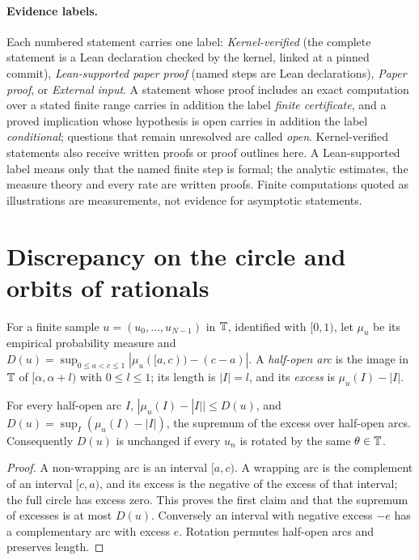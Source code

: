 \documentclass[11pt]{article}
\begin{document}
\paragraph{Evidence labels.} Each numbered statement carries one label:
\emph{Kernel-verified} (the complete statement is a Lean declaration checked by the kernel, linked
at a pinned commit), \emph{Lean-supported paper proof} (named steps are Lean declarations),
\emph{Paper proof}, or \emph{External input}. A statement whose proof includes an exact computation
over a stated finite range carries in addition the label \emph{finite certificate}, and a proved
implication whose hypothesis is open carries in addition the label \emph{conditional}; questions that
remain unresolved are called \emph{open}. Kernel-verified statements also receive written proofs or proof outlines here.
A Lean-supported label means only that the named finite step is formal; the analytic estimates,
the measure theory and every rate are written proofs. Finite computations quoted as illustrations
are measurements, not evidence for asymptotic statements.

\section{Discrepancy on the circle and orbits of rationals}\label{sec:prelim}

For a finite sample $u=(u_0,\ldots,u_{N-1})$ in $\mathbb T$, identified with $[0,1)$, let $\mu_u$ be its
empirical probability measure and $D(u)=\sup_{0\le a<c\le1}|\mu_u([a,c))-(c-a)|$. A
\emph{half-open arc} is the image in $\mathbb T$ of $[\alpha,\alpha+l)$ with $0\le l\le1$; its length is
$|I|=l$, and its \emph{excess} is $\mu_u(I)-|I|$.

\begin{lemma}[Arcs]\label{lem:arcs}
For every half-open arc $I$, $|\mu_u(I)-|I||\le D(u)$, and $D(u)=\sup_I(\mu_u(I)-|I|)$, the supremum
of the excess over half-open arcs. Consequently $D(u)$ is unchanged if every $u_n$ is rotated by
the same $\theta\in\mathbb T$.
\end{lemma}

\begin{proof}
A non-wrapping arc is an interval $[a,c)$. A wrapping arc is the complement of an interval
$[c,a)$, and its excess is the negative of the excess of that interval; the full circle has
excess zero. This proves the first claim and that the supremum of excesses is at most $D(u)$.
Conversely an interval with negative excess $-e$ has a complementary arc with excess $e$.
Rotation permutes half-open arcs and preserves length.
\end{proof}
\end{document}
